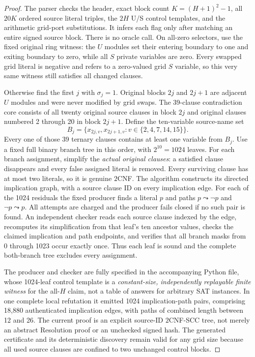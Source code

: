 \documentclass[11pt]{article}
\begin{document}
\begin{proof}
The parser checks the header, exact block count $K=(H+1)^2-1$, all $20K$ ordered source literal triples, the $2H$ U/S control templates, and the arithmetic grid-port substitutions. It infers each flag only after matching an entire signed source block. There is no oracle call. On all-zero selectors, use the fixed original ring witness: the $U$ modules set their entering boundary to one and exiting boundary to zero, while all $S$ private variables are zero. Every swapped grid literal is negative and refers to a zero-valued grid $S$ variable, so this very same witness still satisfies all changed clauses.

Otherwise find the first $j$ with $\sigma_j=1$. Original blocks $2j$ and $2j+1$ are adjacent $U$ modules and were never modified by grid swaps. The 39-clause contradiction core consists of all twenty original source clauses in block $2j$ and original clauses numbered 2 through 20 in block $2j+1$. Define the ten-variable source-name set
\[
 B_j=\{x_{2j,v},x_{2j+1,v}:v\in\{2,4,7,14,15\}\}.
\]
Every one of those 39 ternary clauses contains at least one variable from $B_j$. Use a fixed full binary branch tree in this order, with $2^{10}=1024$ leaves. For each branch assignment, simplify the \emph{actual original clauses}: a satisfied clause disappears and every false assigned literal is removed. Every surviving clause has at most two literals, so it is genuine $2$CNF. The algorithm constructs its directed implication graph, with a source clause ID on every implication edge. For each of the 1024 residuals the fixed producer finds a literal $p$ and paths $p\leadsto\neg p$ and $\neg p\leadsto p$. All attempts are charged and the producer fails closed if no such pair is found. An independent checker reads each source clause indexed by the edge, recomputes its simplification from that leaf's ten ancestor values, checks the claimed implication and path endpoints, and verifies that all branch masks from 0 through 1023 occur exactly once. Thus each leaf is sound and the complete both-branch tree excludes every assignment.

The producer and checker are fully specified in the accompanying Python file, whose 1024-leaf control template is a \emph{constant-size, independently replayable finite witness} for the all-$H$ claim, not a table of answers for arbitrary SAT instances. In one complete local refutation it emitted 1024 implication-path pairs, comprising 18,880 authenticated implication edges, with paths of combined length between 12 and 26. The current proof is an explicit source-ID $2$CNF-SCC tree, not merely an abstract Resolution proof or an unchecked signed hash. The generated certificate and its deterministic discovery remain valid for any grid size because all used source clauses are confined to two unchanged control blocks.
\end{proof}
\end{document}
